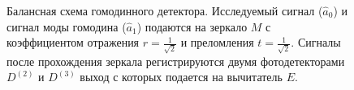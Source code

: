 \begin{figure}
\centering



\caption{Балансная схема гомодинного детектора. Исследуемый сигнал
  ($\hat{a}_0$) и сигнал моды гомодина ($\hat{a}_1$) подаются на
  зеркало $M$ с коэффициентом отражения $r=\frac{1}{\sqrt{2}}$ и
  преломления $t=\frac{1}{\sqrt{2}}$. Сигналы после прохождения
  зеркала регистрируются двумя фотодетекторами $D^{(2)}$ и  $D^{(3)}$
  выход с которых подается на вычитатель $E$.}
\label{figPart3Squeezed_13}
\end{figure}
